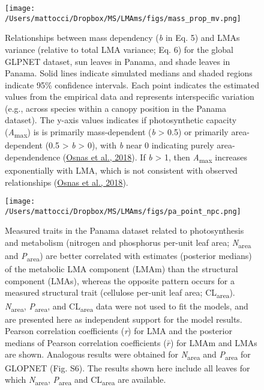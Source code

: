 \documentclass[
  12pt,
  letterpaper,
  DIV=11,
  numbers=noendperiod]{scrartcl}
\begin{document}
\begin{figure}

{\centering \texttt{[image: /Users/mattocci/Dropbox/MS/LMAms/figs/mass\_prop\_mv.png]}

}

\caption{\label{fig-mass_prop}Relationships between mass dependency
(\emph{b} in Eq. 5) and LMAs variance (relative to total LMA variance;
Eq. 6) for the global GLPNET dataset, sun leaves in Panama, and shade
leaves in Panama. Solid lines indicate simulated medians and shaded
regions indicate 95\% confidence intervals. Each point indicates the
estimated values from the empirical data and represents interspecific
variation (e.g., across species within a canopy position in the Panama
dataset). The y-axis values indicates if photosynthetic capacity
(\emph{A}\textsubscript{max}) is is primarily mass-dependent (\emph{b}
\textgreater{} 0.5) or primarily area-dependent (0.5 \textgreater{}
\emph{b} \textgreater{} 0), with \emph{b} near 0 indicating purely
area-dependendence (\protect\hyperlink{ref-Osnas2018}{Osnas et al.,
2018}). If \emph{b} \textgreater{} 1, then \emph{A}\textsubscript{max}
increases exponentially with LMA, which is not consistent with observed
relationships (\protect\hyperlink{ref-Osnas2018}{Osnas et al., 2018}).}

\end{figure}

\newpage

\begin{figure}

{\centering \texttt{[image: /Users/mattocci/Dropbox/MS/LMAms/figs/pa\_point\_npc.png]}

}

\caption{\label{fig-pa_npc}Measured traits in the Panama dataset related
to photosynthesis and metabolism (nitrogen and phosphorus per-unit leaf
area; \emph{N}\textsubscript{area} and \emph{P}\textsubscript{area}) are
better correlated with estimates (posterior medians) of the metabolic
LMA component (LMAm) than the structural component (LMAs), whereas the
opposite pattern occurs for a measured structural trait (cellulose
per-unit leaf area; CL\textsubscript{area}).
\emph{N}\textsubscript{area}, \emph{P}\textsubscript{area}, and
CL\textsubscript{area} data were not used to fit the models, and are
presented here as independent support for the model results. Pearson
correlation coefficients (\emph{r}) for LMA and the posterior medians of
Pearson correlation coefficients (\(\bar{r}\)) for LMAm and LMAs are
shown. Analogous results were obtained for \emph{N}\textsubscript{area}
and \emph{P}\textsubscript{area} for GLOPNET (Fig. S6). The results
shown here include all leaves for which \emph{N}\textsubscript{area},
\emph{P}\textsubscript{area} and CL\textsubscript{area} are available.}

\end{figure}
\end{document}
